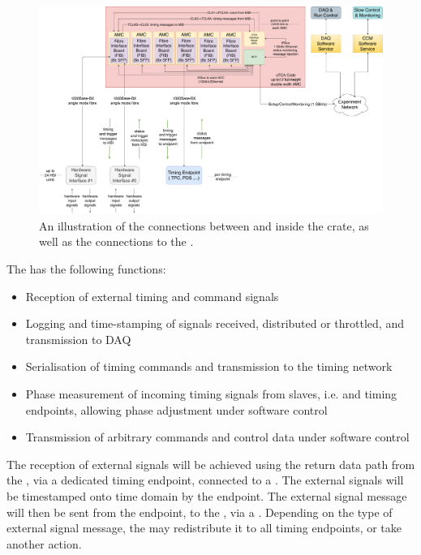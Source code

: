 \documentclass[main.tex]{subfiles}
\begin{document}
\begin{figure}[h]
\includegraphics[width=\textwidth]{DUNE_SP_Timing_ETL_interface_1apr20.pdf}
\caption{An illustration of the connections between  and  inside the  crate, as well as the connections to the .}
\label{fig:mib_utca_connections}
\end{figure}
The  has the following functions:

\begin{itemize}
	\item Reception of external timing and command signals
	\item Logging and time-stamping of signals received, distributed or throttled, and transmission to DAQ
	\item Serialisation of timing commands and transmission to the timing network
	\item Phase measurement of incoming timing signals from slaves, i.e.  and timing endpoints, allowing phase adjustment under software control
	\item Transmission of arbitrary commands and control data under software control
\end{itemize}

The reception of external signals will be achieved using the return data path from the , via a dedicated timing endpoint, connected to a  . The external signals will be timestamped onto  time domain by the  endpoint. The external signal  message will then be sent from the endpoint, to the , via a . Depending on the type of external signal message, the  may redistribute it to all timing endpoints, or take another action. 
\end{document}
